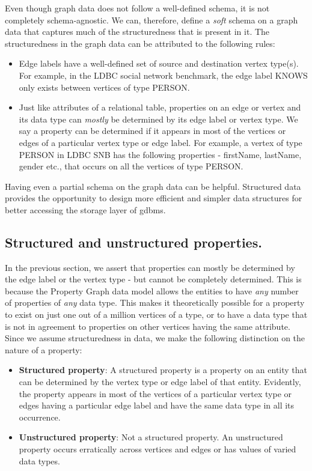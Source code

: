 Even though graph data does not follow a well-defined schema, it is not completely schema-agnostic. We can, therefore, define a \emph{soft} schema on a graph data that captures much of the structuredness that is present in it. The structuredness in the graph data can be attributed to the following rules:
\begin{itemize}
	
	\item Edge labels have a well-defined set of source and destination vertex type(s). For example, in the LDBC social network benchmark, the edge label KNOWS only exists between vertices of type PERSON.
	\item Just like attributes of a relational table, properties on an edge or vertex and its data type can \emph{mostly} be determined by its edge label or vertex type. We say a property can be determined if it appears in most of the vertices or edges of a particular vertex type or edge label. For example, a vertex of type PERSON in LDBC SNB has the following properties - firstName, lastName, gender etc., that occurs on all the vertices of type PERSON.
	
\end{itemize}

Having even a partial schema on the graph data can be helpful. Structured data provides the opportunity to design more efficient and simpler data structures for better accessing the storage layer of \gls{gdbms}.

\subsection{Structured and unstructured properties.}
\label{ssec:structured-unstructured-properties}

In the previous section, we assert that properties can mostly be determined by the edge label or the vertex type - but cannot be completely determined. This is because the Property Graph data model allows the entities to have \emph{any} number of properties of \emph{any} data type. This makes it theoretically possible for a property to exist on just one out of a million vertices of a type, or to have a data type that is not in agreement to properties on other vertices having the same attribute. Since we assume structuredness in data, we make the following distinction on the nature of a property:

\begin{itemize}
	
	\item \textbf{Structured property}: A structured property is a property on an entity that can be determined by the vertex type or edge label of that entity. Evidently, the property appears in most of the vertices of a particular vertex type or edges having a particular edge label and have the same data type in all its occurrence.
	
	\item \textbf{Unstructured property}: Not a structured property. An unstructured property occurs erratically across vertices and edges or has values of varied data types.
	
\end{itemize}

